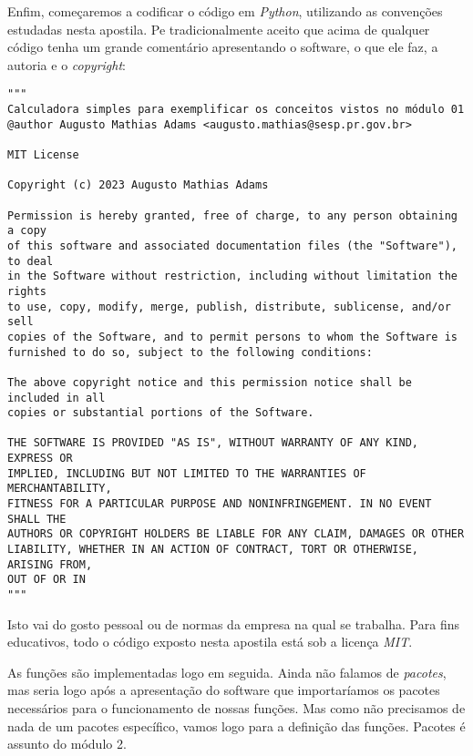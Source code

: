 \documentclass[a4paper, 12pt, onecolumn,singlespacing]{article}
\begin{document}
Enfim, começaremos a codificar o código em \textit{Python}, utilizando as convenções estudadas nesta apostila. Pe tradicionalmente aceito que acima de qualquer código tenha um grande comentário apresentando o software, o que ele faz, a autoria e o \textit{copyright}:

\begin{verbatim}
"""
Calculadora simples para exemplificar os conceitos vistos no módulo 01
@author Augusto Mathias Adams <augusto.mathias@sesp.pr.gov.br>

MIT License

Copyright (c) 2023 Augusto Mathias Adams

Permission is hereby granted, free of charge, to any person obtaining a copy
of this software and associated documentation files (the "Software"), to deal
in the Software without restriction, including without limitation the rights
to use, copy, modify, merge, publish, distribute, sublicense, and/or sell
copies of the Software, and to permit persons to whom the Software is
furnished to do so, subject to the following conditions:

The above copyright notice and this permission notice shall be included in all
copies or substantial portions of the Software.

THE SOFTWARE IS PROVIDED "AS IS", WITHOUT WARRANTY OF ANY KIND, EXPRESS OR
IMPLIED, INCLUDING BUT NOT LIMITED TO THE WARRANTIES OF MERCHANTABILITY,
FITNESS FOR A PARTICULAR PURPOSE AND NONINFRINGEMENT. IN NO EVENT SHALL THE
AUTHORS OR COPYRIGHT HOLDERS BE LIABLE FOR ANY CLAIM, DAMAGES OR OTHER
LIABILITY, WHETHER IN AN ACTION OF CONTRACT, TORT OR OTHERWISE, ARISING FROM,
OUT OF OR IN
"""

\end{verbatim}

Isto vai do gosto pessoal ou de normas da empresa na qual se trabalha. Para fins educativos, todo o código exposto nesta apostila está sob a licença \textit{MIT}.

As funções são implementadas logo em seguida. Ainda não falamos de \textit{pacotes}, mas seria logo após a apresentação do software que importaríamos os pacotes necessários para o funcionamento de nossas funções. Mas como não precisamos de nada de um pacotes específico, vamos logo para a definição das funções. Pacotes é assunto do módulo 2.
\end{document}
